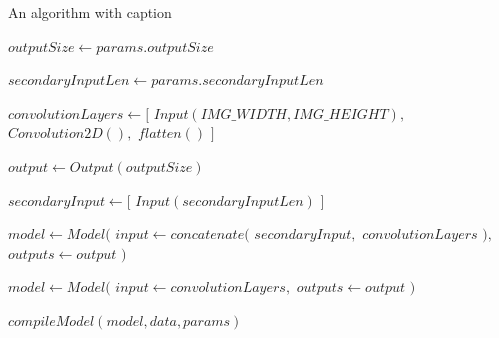 \documentclass[
11pt,
twoside
]{report}
\begin{document}
\begin{algorithm}
\begin{algorithmic}


\caption{An algorithm with caption}\label{alg:cap}


\State $outputSize \gets params.outputSize$


\State $secondaryInputLen \gets params.secondaryInputLen$


\State $convolutionLayers \gets [$
    \State \indent $Input(IMG\_WIDTH, IMG\_HEIGHT),$
    \State \indent $Convolution2D(),$
    \State \indent $flatten()$
\State $]$


\State $output \gets Output(outputSize)$



    \State $secondaryInput \gets [$
        \State \indent $Input(secondaryInputLen)$
    \State $]$

    \State $model \gets Model($
        \State \indent $input \gets concatenate($
            \State \indent \indent $secondaryInput,$
            \State \indent \indent $convolutionLayers$
            \State \indent $),$
            \State \indent $outputs \gets output$
    \State $)$

\Else

    \State $model \gets Model($
        \State \indent $input \gets convolutionLayers,$
        \State \indent $outputs \gets output$
    \State $)$

\EndIf

\State $compileModel(model, data, params)$

\EndProcedure

\end{algorithmic}
\end{algorithm}
\end{document}
